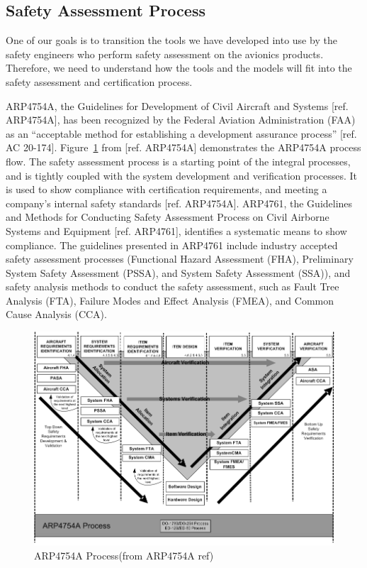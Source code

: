 \subsection{Safety Assessment Process}
\label{subsec:process}

One of our goals is to transition the tools we have developed into use by the safety engineers who perform safety assessment on the avionics products. Therefore, we need to understand how the tools and the models will fit into the safety assessment and certification process.

ARP4754A, the Guidelines for Development of Civil Aircraft and Systems [ref. ARP4754A], has been recognized by the Federal Aviation Administration (FAA) as an ``acceptable method for establishing a development assurance process'' [ref. AC 20-174]. Figure~\ref{fig:arp4754a_process} from [ref. ARP4754A] demonstrates the ARP4754A process flow. The safety assessment process is a starting point of the integral processes, and is tightly coupled with the system development and verification processes. It is used to show compliance with certification requirements, and meeting a company's internal safety standards [ref. ARP4754A]. ARP4761, the Guidelines and Methods for Conducting Safety Assessment Process on Civil Airborne Systems and Equipment [ref. ARP4761], identifies a systematic means to show compliance. The guidelines presented in ARP4761 include industry accepted safety assessment processes (Functional Hazard Assessment (FHA), Preliminary System Safety Assessment (PSSA), and System Safety Assessment (SSA)), and safety analysis methods to conduct the safety assessment, such as Fault Tree Analysis (FTA), Failure Modes and Effect Analysis (FMEA), and Common Cause Analysis (CCA). 

\begin{figure}[h!]
	\vspace{-0.19in}
	\begin{center}
		\includegraphics[trim=0 9 0 5,clip,width=1.0\textwidth]{images/ARP4754A_Process.png}
	\end{center}
	\caption{ARP4754A Process(from ARP4754A ref)}
	\label{fig:arp4754a_process}
\end{figure}

